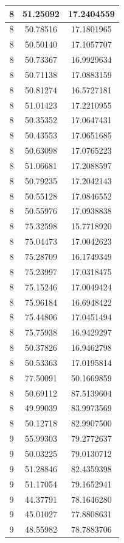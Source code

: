\documentclass[
]{book}
\begin{document}
\begin{tabular}{c|c|c}
\hline
8 & 51.25092 & 17.2404559\\
\hline
8 & 50.78516 & 17.1801965\\
\hline
8 & 50.50140 & 17.1057707\\
\hline
8 & 50.73367 & 16.9929634\\
\hline
8 & 50.71138 & 17.0883159\\
\hline
8 & 50.81274 & 16.5727181\\
\hline
8 & 51.01423 & 17.2210955\\
\hline
8 & 50.35352 & 17.0647431\\
\hline
8 & 50.43553 & 17.0651685\\
\hline
8 & 50.63098 & 17.0765223\\
\hline
8 & 51.06681 & 17.2088597\\
\hline
8 & 50.79235 & 17.2042143\\
\hline
8 & 50.55128 & 17.0846552\\
\hline
8 & 50.55976 & 17.0938838\\
\hline
8 & 75.32598 & 15.7718920\\
\hline
8 & 75.04473 & 17.0042623\\
\hline
8 & 75.28709 & 16.1749349\\
\hline
8 & 75.23997 & 17.0318475\\
\hline
8 & 75.15246 & 17.0049424\\
\hline
8 & 75.96184 & 16.6948422\\
\hline
8 & 75.44806 & 17.0451494\\
\hline
8 & 75.75938 & 16.9429297\\
\hline
8 & 50.37826 & 16.9462798\\
\hline
8 & 50.53363 & 17.0195814\\
\hline
8 & 77.50091 & 50.1669859\\
\hline
8 & 50.69112 & 87.5139604\\
\hline
8 & 49.99039 & 83.9973569\\
\hline
8 & 50.12718 & 82.9907500\\
\hline
9 & 55.99303 & 79.2772637\\
\hline
9 & 50.03225 & 79.0130712\\
\hline
9 & 51.28846 & 82.4359398\\
\hline
9 & 51.17054 & 79.1652941\\
\hline
9 & 44.37791 & 78.1646280\\
\hline
9 & 45.01027 & 77.8808631\\
\hline
9 & 48.55982 & 78.7883706\\

\end{tabular}
\end{document}
